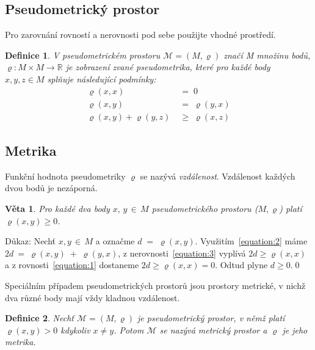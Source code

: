 \documentclass[a4paper,11pt,twocolumn]{article}
\newtheorem{theorem}{Věta}
\newtheorem{definition}{Definice}
\begin{document}
\subsection{Pseudometrický prostor}
Pro zarovnání rovností a nerovnosti pod sebe použijte vhodné prostředí.

\begin{definition}
V \textnormal{pseudometrickém prostoru \(\mathcal{M} = (M, \varrho)\)} značí M množinu bodů,
$\varrho : M \times M \rightarrow \mathbb{R}$ je zobrazení zvané \textnormal{pseudometrika}, které pro každé body $x,y,z \in M$
splňuje následující podmínky:
\begin{align}
    \varrho(x, x) \;&=\; 0 \label{equation:1}\\
    \varrho(x, y) \;&=\; \varrho(y, x) \label{equation:2}\\
    \varrho(x, y) + \varrho(y, z) \;&\geq\; \varrho(x, z) \label{equation:3}
\end{align}
\end{definition}

\subsection{Metrika}
Funkční hodnota pseudometriky $\varrho$ se nazývá \emph{vzdálenost}.
Vzdálenost každých dvou bodů je nezáporná.

\begin{theorem}
Pro každé dva body $x, \,y \,\in\, M$ pseudometrického prostoru \textnormal{($M, \varrho$)} platí $\varrho(x,y) \geq 0$.\label{statement:1}\end{theorem}

Důkaz: \:Nechť $x, y \,\in\, M$ \:a\: označme $d \;=\; \varrho(x,y)$. Využitím~\eqref{equation:2} máme $2d \:=\: \varrho(x,y) \;+\; \varrho(y,x) $, z nerovnosti~\eqref{equation:3} vyplívá $2d \geq \varrho(x,x)$ a z rovnosti~\eqref{equation:1} dostaneme $2d \geq \varrho(x,x) = 0$. Odtud plyne $d \geq 0$.\qed

Speciálním případem pseudometrických prostorů jsou prostory metrické,
v nichž dva různé body mají vždy kladnou vzdálenost.

\begin{definition}
Nechť \(\mathcal{M} = (M, \varrho)\) je pseudometrický prostor, v němž platí $\varrho(x,y) > 0$ kdykoliv $x \neq y$.
Potom \(\mathcal{M}\) se nazývá \textnormal{metrický prostor}
a $\varrho$ je jeho \textnormal{metrika.}\label{def:2}
\end{definition}
\end{document}
